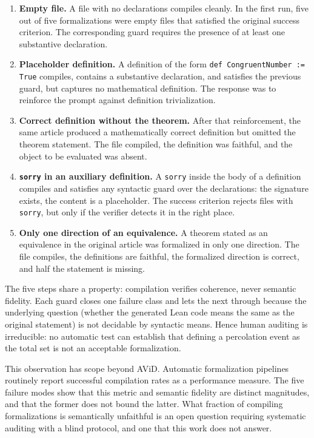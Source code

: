 \begin{enumerate}
\item \textbf{Empty file.} A file with no declarations compiles cleanly. In the first run, five out of five formalizations were empty files that satisfied the original success criterion. The corresponding guard requires the presence of at least one substantive declaration.

\item \textbf{Placeholder definition.} A definition of the form \texttt{def CongruentNumber := True} compiles, contains a substantive declaration, and satisfies the previous guard, but captures no mathematical definition. The response was to reinforce the prompt against definition trivialization.

\item \textbf{Correct definition without the theorem.} After that reinforcement, the same article produced a mathematically correct definition but omitted the theorem statement. The file compiled, the definition was faithful, and the object to be evaluated was absent.

\item \textbf{\texttt{sorry} in an auxiliary definition.} A \texttt{sorry} inside the body of a definition compiles and satisfies any syntactic guard over the declarations: the signature exists, the content is a placeholder. The success criterion rejects files with \texttt{sorry}, but only if the verifier detects it in the right place.

\item \textbf{Only one direction of an equivalence.} A theorem stated as an equivalence in the original article was formalized in only one direction. The file compiles, the definitions are faithful, the formalized direction is correct, and half the statement is missing.
\end{enumerate}

The five steps share a property: compilation verifies coherence, never semantic fidelity. Each guard closes one failure class and lets the next through because the underlying question (whether the generated Lean code means the same as the original statement) is not decidable by syntactic means. Hence human auditing is irreducible: no automatic test can establish that defining a percolation event as the total set is not an acceptable formalization.

This observation has scope beyond AViD. Automatic formalization pipelines routinely report successful compilation rates as a performance measure. The five failure modes show that this metric and semantic fidelity are distinct magnitudes, and that the former does not bound the latter. What fraction of compiling formalizations is semantically unfaithful is an open question requiring systematic auditing with a blind protocol, and one that this work does not answer.

